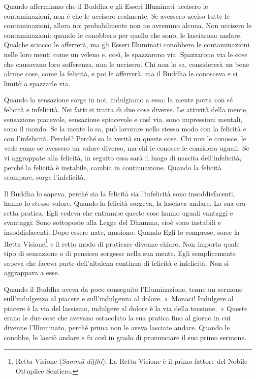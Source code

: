 Quando affermiamo che il Buddha e gli Esseri Illuminati uccisero le
contaminazioni, non è che le uccisero realmente. Se avessero ucciso
tutte le contaminazioni, allora noi probabilmente non ne avremmo alcuna.
Non uccisero le contaminazioni: quando le conobbero per quello che sono,
le lasciarono andare. Qualche sciocco le afferrerà, ma gli Esseri
Illuminati conobbero le contaminazioni nelle loro menti come un veleno
e, così, le spazzarono via. Spazzarono via le cose che causavano loro
sofferenza, non le uccisero. Chi non lo sa, considererà un bene alcune
cose, come la felicità, e poi le afferrerà, ma il Buddha le conosceva e
si limitò a spazzarle via.

Quando la sensazione sorge in noi, indulgiamo a essa: la mente porta con
sé felicità e infelicità. Nei fatti si tratta di due cose diverse. Le
attività della mente, sensazione piacevole, sensazione spiacevole e così
via, sono impressioni mentali, sono il mondo. Se la mente lo sa, può
lavorare nello stesso modo con la felicità e con l'infelicità. Perché?
Perché sa la verità su queste cose. Chi non le conosce, le vede come se
avessero un valore diverso, ma chi le conosce le considera uguali. Se vi
aggrappate alla felicità, in seguito essa sarà il luogo di nascita
dell'infelicità, perché la felicità è instabile, cambia in
continuazione. Quando la felicità scompare, sorge l'infelicità.

Il Buddha lo sapeva, perché sia la felicità sia l'infelicità sono
insoddisfacenti, hanno lo stesso valore. Quando la felicità sorgeva, la
lasciava andare. La sua era retta pratica, Egli vedeva che entrambe
queste cose hanno uguali vantaggi e svantaggi. Sono sottoposte alla
Legge del Dhamma, cioè sono instabili e insoddisfacenti. Dopo essere
nate, muoiono. Quando Egli lo comprese, sorse la Retta Visione\footnote{Retta
  Visione (\emph{Sammā-diṭṭhi}): La Retta Visione è il primo fattore del
  Nobile Ottuplice Sentiero.} e il retto modo di praticare divenne
chiaro. Non importa quale tipo di sensazione o di pensiero sorgesse
nella sua mente, Egli semplicemente sapeva che faceva parte
dell'altalena continua di felicità e infelicità. Non si aggrappava a
esse.

Quando il Buddha aveva da poco conseguito l'Illuminazione, tenne un
sermone sull'indulgenza al piacere e sull'indulgenza al dolore.
«~Monaci! Indulgere al piacere è la via del lassismo, indulgere al
dolore è la via della tensione.~» Queste erano le due cose che avevano
ostacolato la sua pratica fino al giorno in cui divenne l'Illuminato,
perché prima non le aveva lasciate andare. Quando le conobbe, le lasciò
andare e fu così in grado di pronunciare il suo primo sermone.

